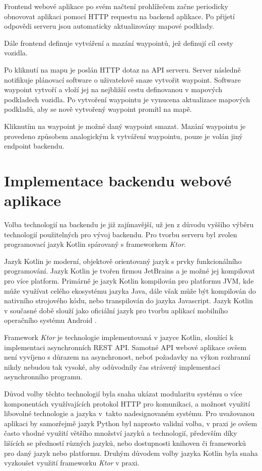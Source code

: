 \documentclass[czech, bachelor]{diploma}
\begin{document}
Frontend webové aplikace po svém načtení prohlížečem začne periodicky obnovovat aplikaci pomocí HTTP requestu na backend aplikace.
Po přijetí odpovědi serveru jsou automaticky aktualizovány mapové podklady.

Dále frontend definuje vytváření a mazání waypointů, jež definují cíl cesty vozidla.

Po kliknutí na mapu je poslán HTTP dotaz na API serveru. Server následně notifikuje plánovací software o uživatelově snaze
vytvořit waypoint. Software waypoint vytvoří a vloží jej na nejbližší cestu definovanou v mapových podkladech vozidla.
Po vytvoření waypointu je vynucena aktualizace mapových podkladů, aby se nově vytvořený waypoint promítl na mapě.

Kliknutím na waypoint je možné daný waypoint smazat. Mazání waypointu je provedeno způsobem analogickým k vytváření waypointu,
pouze je volán jiný endpoint backendu.

\section{Implementace backendu webové aplikace}

Volba technologií na backendu je již zajímavější, už jen z důvodu vyššího výběru technologií použitelných pro vývoj backendu.
Pro tvorbu serveru byl zvolen programovací jazyk Kotlin spárovaný s frameworkem \emph{Ktor}.

Jazyk Kotlin je moderní, objektově orientovaný jazyk s prvky funkcionálního programování. Jazyk Kotlin je tvořen firmou JetBrains
a je možné jej kompilovat pro více platform. Primárně je jazyk Kotlin kompilován pro platformu JVM, kde může využívat celého
ekosystému jazyka Java, dále však může být kompilován do nativního strojového kódu, nebo transpilován do jazyka Javascript. Jazyk
Kotlin v současné době slouží jako oficiální jazyk pro tvorbu aplikací mobilního operačního systému Android
\cite{kotlin-android-source}.

Framework \emph{Ktor} je technologie implementovaná v jazyce Kotlin, sloužící k implementaci asynchronních REST API. Samotné API
webové aplikace ovšem není vyvíjeno s důrazem na asynchronost, neboť požadavky na výkon rozhranní nikdy nebudou tak vysoké, aby
odůvodnily čas strávený implementací asynchronního programu.

Důvod volby těchto technologií byla snaha ukázat modularitu systému o více komponentách využívajících protokol HTTP
pro komunikaci, a možnost využití libovolné technologie a jazyka v~takto nadesignovaném systému. Pro uvažovanou aplikaci by
samozřejmě jazyk Python byl naprosto validní volba, v praxi je ovšem často vhodné využití většího množství jazyků a technologií,
především díky lišících se předností různých jazyků, nebo dostupnosti knihoven či frameworků pro daný jazyk nebo platformu. Druhým
důvodem volby jazyka Kotlin byla snaha vyzkoušet využití frameworku \emph{Ktor} v praxi.
\end{document}
